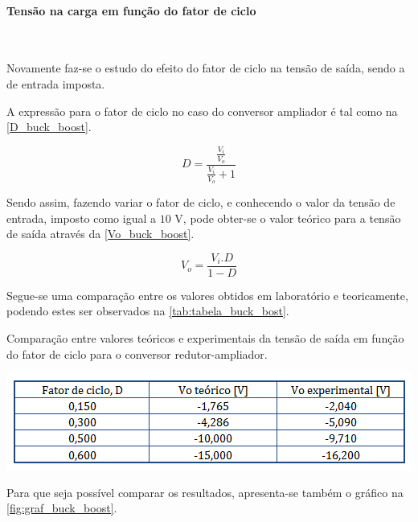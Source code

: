 \documentclass[a4paper,11pt]{article}
\numberwithin{equation}{section}
\begin{document}
\paragraph{Tensão na carga em função do fator de ciclo}\mbox{}\

Novamente faz-se o estudo do efeito do fator de ciclo na tensão de saída, sendo a de entrada imposta.

A expressão para o fator de ciclo no caso do conversor ampliador é tal como na \autoref{D_buck_boost}.

\begin{equation}
D = \frac{\frac{V_i}{V_o}}{\frac{V_i}{V_o} + 1} \label{D_buck_boost}
\end{equation}

Sendo assim, fazendo variar o fator de ciclo, e conhecendo o valor da tensão de entrada, imposto como igual a $10$ V, pode obter-se o valor teórico para a tensão de saída através da \autoref{Vo_buck_boost}.

\begin{equation}
V_o = \frac{V_i.D}{1-D} \label{Vo_buck_boost}
\end{equation}

Segue-se uma comparação entre os valores obtidos em laboratório e teoricamente, podendo estes ser observados na \autoref{tab:tabela_buck_bost}.

\begin{table}[!htb]
	\centering
	\caption{Comparação entre valores teóricos e experimentais da tensão de saída em função do fator de ciclo para o conversor redutor-ampliador.}
	\includegraphics[width=0.8\linewidth]{teoricas/tabela_buck_boost}
	\label{tab:tabela_buck_bost}
\end{table}

Para que seja possível comparar os resultados, apresenta-se também o gráfico na \autoref{fig:graf_buck_boost}.
\end{document}
